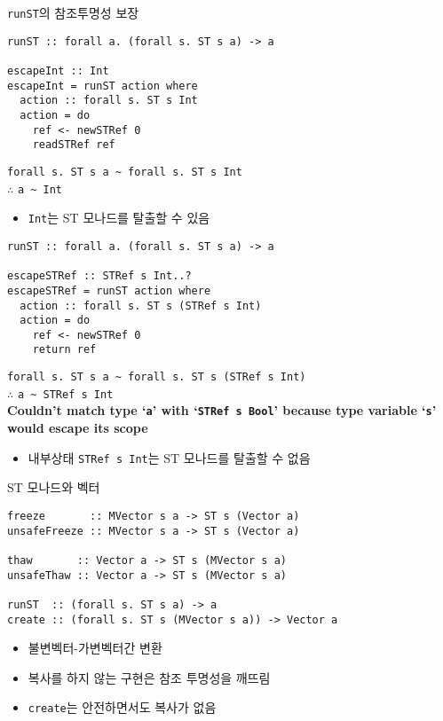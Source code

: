 \documentclass{beamer}
\begin{document}
\begin{frame}[fragile] {\texttt{runST}의 참조투명성 보장}
  \begin{overprint}
\begin{verbatim}
runST :: forall a. (forall s. ST s a) -> a

escapeInt :: Int
escapeInt = runST action where
  action :: forall s. ST s Int
  action = do
    ref <- newSTRef 0
    readSTRef ref
\end{verbatim}
    \texttt{\newline forall s. ST s a \textasciitilde \ forall s. ST s Int}\\
    \(\therefore\) \texttt{a \textasciitilde \ Int}
    \begin{itemize}
      \item \texttt{Int}는 ST 모나드를 탈출할 수 있음
    \end{itemize}
\begin{verbatim}
runST :: forall a. (forall s. ST s a) -> a

escapeSTRef :: STRef s Int..?
escapeSTRef = runST action where
  action :: forall s. ST s (STRef s Int)
  action = do
    ref <- newSTRef 0
    return ref
\end{verbatim}
    \texttt{\newline forall s. ST s a \textasciitilde \ forall s. ST s (STRef s Int)}\\
    \(\therefore\) \texttt{a \textasciitilde \ STRef s Int}\\
    \textbf{Couldn't match type \enquote*{\texttt{a}} with \enquote*{\texttt{STRef s Bool}} because type variable \enquote*{\texttt{s}} would escape its scope}
  \begin{itemize}
    \item 내부상태 \texttt{STRef s Int}는 ST 모나드를 탈출할 수 없음
  \end{itemize}
  \end{overprint}
\end{frame}

\begin{frame}[fragile] {ST 모나드와 벡터}
\begin{verbatim}
freeze       :: MVector s a -> ST s (Vector a)
unsafeFreeze :: MVector s a -> ST s (Vector a) 

thaw       :: Vector a -> ST s (MVector s a)
unsafeThaw :: Vector a -> ST s (MVector s a)

runST  :: (forall s. ST s a) -> a
create :: (forall s. ST s (MVector s a)) -> Vector a
\end{verbatim}
  \begin{itemize}
    \item 불변벡터-가변벡터간 변환
    \pause
    \item 복사를 하지 않는 구현은 참조 투명성을 깨뜨림
    \item \texttt{create}는 안전하면서도 복사가 없음
  \end{itemize}
\end{frame}
\end{document}
